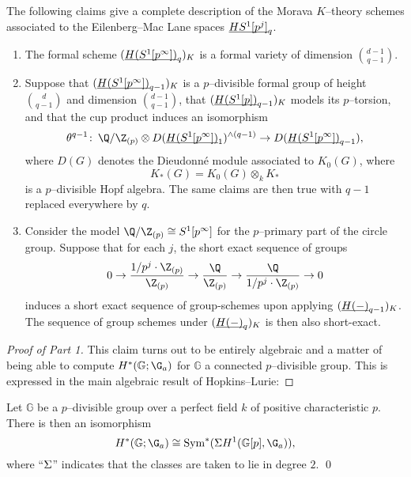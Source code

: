 \begin{theorem}\label{MainKThyOfEMSpacesTheorem}
The following claims give a complete description of the Morava \(K\)--theory schemes associated to the Eilenberg--Mac Lane spaces \(\underline{\smash{HS^1[p^j]}}_{q}\).
\begin{enumerate}
    \item The formal scheme \((\underline{\smash{H(S^1[p^\infty])}}_{q})_K\) is a formal variety of dimension \(\binom{d-1}{q-1}\).
    \item Suppose that \((\underline{\smash{H(S^1[p^\infty])}}_{q-1})_K\) is a \(p\)--divisible formal group of height \(\binom{d}{q-1}\) and dimension \(\binom{d-1}{q-1}\), that \((\underline{\smash{H(S^1[p])}}_{q-1})_K\) models its \(p\)--torsion, and that the cup product induces an isomorphism \[\theta^{q-1}\co \Q / \Z_{(p)} \otimes D(\OS{H(S^1[p^\infty])}{1})^{\wedge (q-1)} \to D(\OS{H(S^1[p^\infty])}{q-1}),\] where \(D(G)\) denotes the Dieudonn\'e module associated to \(K_0(G)\), where \[K_*(G) = K_0(G) \otimes_k K_*\] is a \(p\)--divisible Hopf algebra.  The same claims are then true with \(q-1\) replaced everywhere by \(q\).
    \item Consider the model \(\Q / \Z_{(p)} \cong S^1[p^\infty]\) for the \(p\)--primary part of the circle group.  Suppose that for each \(j\), the short exact sequence of groups \[0 \to \frac{1/p^j \cdot \Z_{(p)}}{\Z_{(p)}} \to \frac{\Q}{\Z_{(p)}} \to \frac{\Q}{1/p^j \cdot \Z_{(p)}} \to 0\] induces a short exact sequence of group-schemes upon applying \((\underline{\smash{H(-)}}_{q-1})_K\).  The sequence of group schemes under \((\underline{\smash{H(-)}}_{q})_K\) is then also short-exact.
\end{enumerate}
\end{theorem}
\begin{proof}[Proof of Part 1]\renewcommand{\qedsymbol}{\relax}
This claim turns out to be entirely algebraic and a matter of being able to compute \(H^*(\mathbb G; \G_a)\) for \(\mathbb G\) a connected \(p\)--divisible group.  This is expressed in the main algebraic result of Hopkins--Lurie:
\end{proof}

\begin{theorem}
Let \(\mathbb G\) be a \(p\)--divisible group over a perfect field \(k\) of positive characteristic \(p\).  There is then an isomorphism \[H^*(\mathbb G; \G_a) \cong \Sym^*(\Susp H^1(\mathbb G[p], \G_a)),\] where ``\(\Sigma\)'' indicates that the classes are taken to lie in degree \(2\). \qed
\end{theorem}


